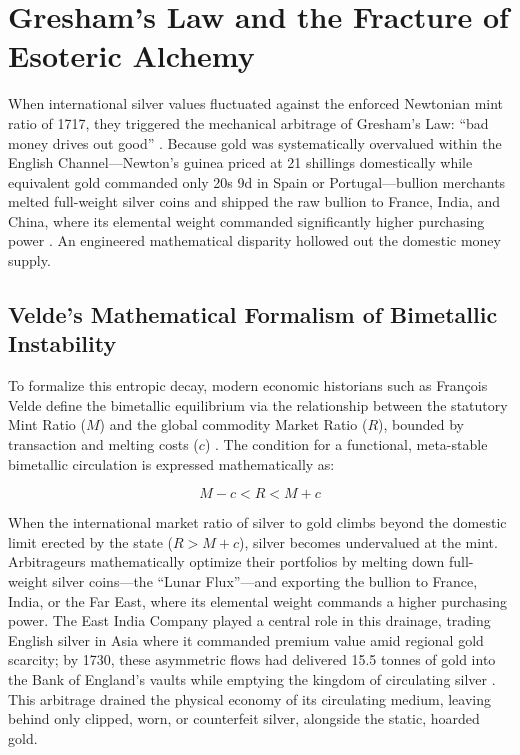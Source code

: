 \documentclass[
]{article}
\begin{document}
\newpage

\section{Gresham's Law and the Fracture of Esoteric
Alchemy}\label{greshams-law-and-the-fracture-of-esoteric-alchemy}

When international silver values fluctuated against the enforced
Newtonian mint ratio of 1717, they triggered the mechanical arbitrage of
Gresham's Law: ``bad money drives out good'' \citep{thornton1802nature}.
Because gold was systematically overvalued within the English
Channel---Newton's guinea priced at 21 shillings domestically while
equivalent gold commanded only 20s 9d in Spain or Portugal---bullion
merchants melted full-weight silver coins and shipped the raw bullion to
France, India, and China, where its elemental weight commanded
significantly higher purchasing power \citep{quinn1996competing}. An
engineered mathematical disparity hollowed out the domestic money
supply.

\subsection{Velde's Mathematical Formalism of Bimetallic
Instability}\label{veldes-mathematical-formalism-of-bimetallic-instability}

To formalize this entropic decay, modern economic historians such as
François Velde define the bimetallic equilibrium via the relationship
between the statutory Mint Ratio (\(M\)) and the global commodity Market
Ratio (\(R\)), bounded by transaction and melting costs (\(c\))
\citep{velde2005bimetallism}. The condition for a functional,
meta-stable bimetallic circulation is expressed mathematically as:

\begin{equation}
\label{eq:bimetallic_bounds}
M - c < R < M + c
\end{equation}

When the international market ratio of silver to gold climbs beyond the
domestic limit erected by the state (\(R > M + c\)), silver becomes
undervalued at the mint. Arbitrageurs mathematically optimize their
portfolios by melting down full-weight silver coins---the ``Lunar
Flux''---and exporting the bullion to France, India, or the Far East,
where its elemental weight commands a higher purchasing power. The East
India Company played a central role in this drainage, trading English
silver in Asia where it commanded premium value amid regional gold
scarcity; by 1730, these asymmetric flows had delivered 15.5 tonnes of
gold into the Bank of England's vaults while emptying the kingdom of
circulating silver \citep{quinn2006bank}. This arbitrage drained the
physical economy of its circulating medium, leaving behind only clipped,
worn, or counterfeit silver, alongside the static, hoarded gold.
\end{document}
